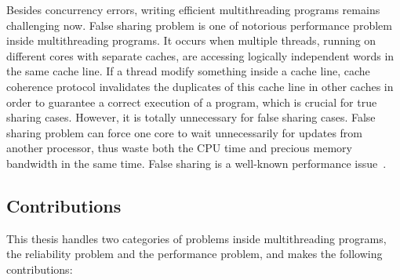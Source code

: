 Besides concurrency errors, writing efficient multithreading programs remains challenging now. False sharing problem is one of notorious performance problem inside multithreading programs. It occurs when multiple threads, running on different cores with separate caches, are accessing logically independent words in the same cache line. If a thread modify something inside a cache line, cache coherence protocol invalidates the duplicates of this cache line in other caches in order to guarantee a correct execution of a program, which is crucial for true sharing cases. However, it is totally unnecessary for false sharing cases. False sharing problem can force one core to wait unnecessarily for updates from another processor, thus waste both the CPU time and precious memory bandwidth in the same time. False sharing is a well-known performance issue~\cite{falseshare:Analysis, falseshare:effect}. 

\subsection*{Contributions}

This thesis handles two categories of problems inside multithreading programs, the reliability problem and the performance problem, and makes the following contributions:

